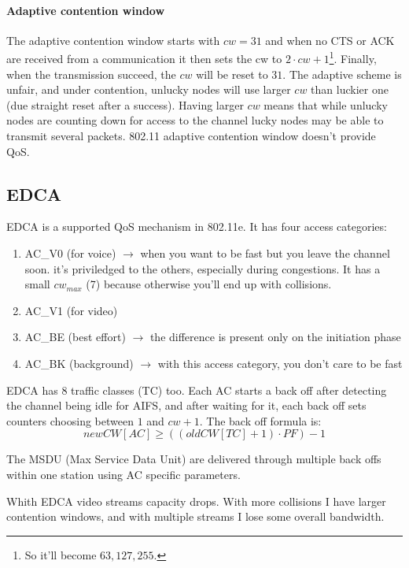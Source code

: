 \paragraph*{Adaptive contention window} The adaptive contention window starts
with $cw = 31$ and when no CTS or ACK are received from a communication it then
sets the cw to $2 \cdot cw + 1$\footnote{So it'll become $63, 127, 255$.}.
Finally, when the transmission succeed, the $cw$ will be reset to $31$.
The adaptive scheme is unfair, and under contention, unlucky nodes will use
larger $cw$ than luckier one (due straight reset after a success). Having larger
$cw$ means that while unlucky nodes are counting down for access to the channel
lucky nodes may be able to transmit several packets. 802.11 adaptive contention
window doesn't provide QoS.

\subsection{EDCA}

EDCA is a supported QoS mechanism in 802.11e. It has four access categories:
\begin{enumerate}
\item AC\_V0 (for voice) $\to$ when you want to be fast but you leave the
  channel soon. it's priviledged to the others, especially during congestions.
  It has a small $cw_{max}$ (7) because otherwise you'll end up with collisions.
\item AC\_V1 (for video)
\item AC\_BE (best effort) $\to$ the difference is present only on the
  initiation phase
\item AC\_BK (background) $\to$ with this access category, you don't care to be
  fast
\end{enumerate}

EDCA has 8 traffic classes (TC) too.
Each AC starts a back off after detecting the channel being idle for AIFS, and
after waiting for it, each back off sets counters choosing between $1$ and
$cw + 1$. The back off formula is:
\begin{equation}
newCW[AC] \ge ((oldCW[TC] + 1) \cdot PF) - 1
\end{equation}

The MSDU (Max Service Data Unit) are delivered through multiple back offs
within one station using AC specific parameters.

Whith EDCA video streams capacity drops. With more collisions I have larger
contention windows, and with multiple streams I lose some overall bandwidth.

